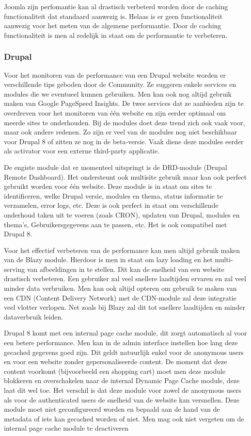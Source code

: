 Joomla zijn perfomantie kan al drastisch verbeterd worden door de caching functionaliteit dat standaard aanwezig is. Helaas is er geen functionaliteit aanwezig voor het meten van de algemene performantie. Door de caching functionaliteit is men al redelijk in staat om de performantie te verbeteren.
\subsubsection{Drupal}
Voor het monitoren van de performance van een Drupal website worden er verschillende tips geboden door de Community. Ze suggeren enkele services en modules die we eventueel kunnen gebruiken. Men kan ook nog altijd gebruik maken van Google PageSpeed Insights. De twee services dat ze aanbieden zijn te overdreven voor het monitoren van één website en zijn eerder optimaal om meerde sites te onderhouden. Bij de modules doet deze trend zich ook vaak voor, maar ook andere redenen. Zo zijn er veel van de modules nog niet beschikbaar voor Drupal 8 of zitten ze nog in de beta-versie. Vaak diene deze modules eerder als activator voor een externe third-party applicatie. 

De engiste module dat er momenteel uitspringt is de DRD-module (Drupal Remote Dashboard). Het ondersteunt ook multisite gebruik maar kan ook perfect gebruikt worden voor één website. Deze module is in staat om sites te identificeren, welke Drupal versie, modules en thema, status informatie te verzamelen, error logs, etc. Deze is ook perfect in staat om verschillende onderhoud taken uit te voeren (zoals CRON), updaten van Drupal, modules en thema's, Gebruikersgegevens aan te passen, etc. Het is ook compatibel met Drupal 8. 

Voor het effectief verbeteren van de performance kan men altijd gebruik maken van de Blazy module. Hierdoor is men in staat om lazy loading en het multi-serving van afbeeldingen in te stellen. Dit kan de snelheid van een website drastisch verbeteren. Een gebruiker zal veel snellere laadtijden ervaren en zal veel minder data verbruiken. Men kan ook altijd opteren om gebruik te maken van een CDN (Content Delivery Network) met de CDN-module zal deze integratie veel vlotter verlopen. Net zoals bij Blazy zal dit tot snellere laadtijden en minder dataverbruik leiden.

Drupal 8 komt met een internal page cache module, dit zorgt automatisch al voor een betere performance. Men kan in de admin interface instellen hoe lang deze gecached gegevens goed zijn. Dit geldt natuurlijk enkel voor de anonymous users en voor een website zonder gepersonaliseerde content. De moment dat deze content voorkomt (bijvoorbeeld een shopping cart) moet men deze module blokkeren en overschakelen naar de internal Dynamic Page Cache module, deze laat dit wel toe. Het verschil is dat deze module voor zowel de anonymous users als voor de authenticated users de snelheid van de website kan versnellen. Deze module moet niet geconfigureerd worden en bepaald aan de hand van de metadata of iets kan gecached worden of niet. Men mag ook niet vergeten om de internal page cache module te deactiveren

